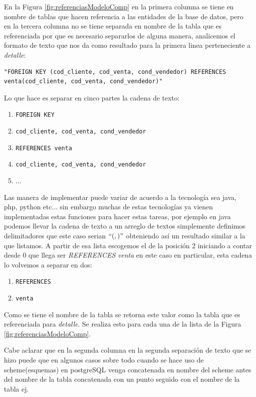 En la Figura \ref{fig:referenciasModeloComp} en la primera columna se tiene en nombre de tablas que hacen referencia a las entidades de la base de datos, pero en la tercera columna no se tiene separada en nombre de la tabla que es referenciada por que es necesario separarlos de alguna manera, analicemos el formato de texto que nos da como resultado para la primera linea perteneciente a \textit{detalle}:
\lstset{language=sql,breaklines=true}
\begin{lstlisting}
"FOREIGN KEY (cod_cliente, cod_venta, cond_vendedor) REFERENCES venta(cod_cliente, cod_venta, cond_vendedor)"
\end{lstlisting}
Lo que hace es separar en cinco partes la cadena de texto:
\begin{enumerate}
\item \texttt{FOREIGN KEY}
\item \texttt{cod\_cliente, cod\_venta, cond\_vendedor}
\item \texttt{REFERENCES venta}
\item \texttt{cod\_cliente, cod\_venta, cond\_vendedor}
\item ...
\end{enumerate}
Las manera de implementar puede variar de acuerdo a la tecnolog\'ia sea java, php, python etc... sin embargo muchas de estas tecnolog\'ias ya vienen implementadas estas funciones para hacer estas tareas, por ejemplo en java podemos llevar la cadena de texto a un arreglo de textos simplemente definimos delimitadores que este caso serian $`` (  ,  )  "$   obteniendo as\'i un resultado similar a la que listamos. A partir de esa lista escogemos el de la posici\'on 2 iniciando a contar desde 0 que llega ser \textit{REFERENCES venta} en este caso en particular, esta cadena lo volvemos a separar en dos:
\begin{enumerate}
\item \texttt{REFERENCES}
\item \texttt{venta}
\end{enumerate}
Como se tiene el nombre de la tabla se retorna este valor como la tabla que es referenciada para \textit{detalle}. Se realiza esto para cada una de la lista de la Figura \ref{fig:referenciasModeloComp}.

Cabe aclarar que en la segunda columna en la segunda separaci\'on de texto que se hizo puede que en algunos casos sobre todo cuando se hace uso de scheme(esquemas) en postgreSQL venga concatenada en nombre del scheme antes del nombre de la tabla concatenada con un punto seguido con el nombre de la tabla ej.


